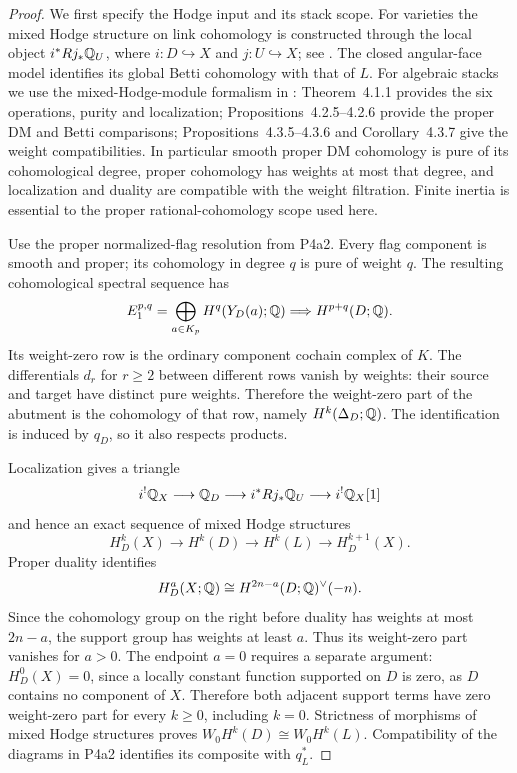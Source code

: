 \begin{proof}
We first specify the Hodge input and its stack scope. For varieties the mixed Hodge structure on link cohomology is constructed through the local object $i^*Rj_*\mathbb Q_U$, where $i:D\hookrightarrow X$ and $j:U\hookrightarrow X$; see \cite[Definitions~2.7--2.8 and Propositions~2.9, 3.5]{DurfeeSaito1990}. The closed angular-face model identifies its global Betti cohomology with that of $L$. For algebraic stacks we use the mixed-Hodge-module formalism in \cite{Tubach2025}: Theorem~4.1.1 provides the six operations, purity and localization; Propositions~4.2.5--4.2.6 provide the proper DM and Betti comparisons; Propositions~4.3.5--4.3.6 and Corollary~4.3.7 give the weight compatibilities. In particular smooth proper DM cohomology is pure of its cohomological degree, proper cohomology has weights at most that degree, and localization and duality are compatible with the weight filtration. Finite inertia is essential to the proper rational-cohomology scope used here.

Use the proper normalized-flag resolution from P4a2. Every flag component is smooth and proper; its cohomology in degree $q$ is pure of weight $q$. The resulting cohomological spectral sequence has
\[
 E_1^{p,q}=\bigoplus_{a\in K_p}H^q(Y_D(a);\mathbb Q)
 \Longrightarrow H^{p+q}(D;\mathbb Q).
\]
Its weight-zero row is the ordinary component cochain complex of $K$. The differentials $d_r$ for $r\ge2$ between different rows vanish by weights: their source and target have distinct pure weights. Therefore the weight-zero part of the abutment is the cohomology of that row, namely $H^k(\Delta_D;\mathbb Q)$. The identification is induced by $q_D$, so it also respects products.

Localization gives a triangle
\[
 i^!\mathbb Q_X\longrightarrow\mathbb Q_D\longrightarrow i^*Rj_*\mathbb Q_U
 \longrightarrow i^!\mathbb Q_X[1]
\]
and hence an exact sequence of mixed Hodge structures
\[
 H_D^k(X)\longrightarrow H^k(D)\longrightarrow H^k(L)
 \longrightarrow H_D^{k+1}(X).
\]
Proper duality identifies
\[
 H_D^a(X;\mathbb Q)\cong H^{2n-a}(D;\mathbb Q)^\vee(-n).
\]
Since the cohomology group on the right before duality has weights at most $2n-a$, the support group has weights at least $a$. Thus its weight-zero part vanishes for $a>0$. The endpoint $a=0$ requires a separate argument: $H_D^0(X)=0$, since a locally constant function supported on $D$ is zero, as $D$ contains no component of $X$. Therefore both adjacent support terms have zero weight-zero part for every $k\ge0$, including $k=0$. Strictness of morphisms of mixed Hodge structures proves $W_0H^k(D)\cong W_0H^k(L)$. Compatibility of the diagrams in P4a2 identifies its composite with $q_L^*$.


\end{proof}
